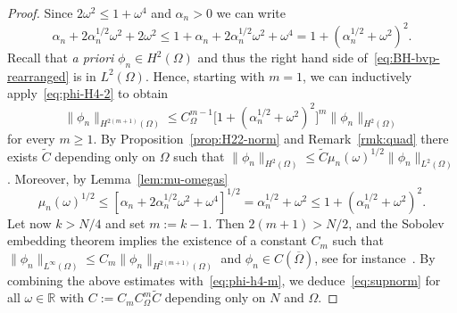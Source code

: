\documentclass[a4paper, reqno]{amsart}
\numberwithin{equation}{section}
\theoremstyle{plain}
\theoremstyle{definition}
\theoremstyle{remark}
\newcommand{\RR}{\mathbb{R}}
\begin{document}
\begin{proof}
  Since $2\omega^2\leq 1+\omega^4$ and $\alpha_n>0$ we can write
  \begin{equation*}
    \alpha_n + 2\alpha_n^{1/2}\omega^2 + 2\omega^2
    \leq  1+\alpha_n + 2\alpha_n^{1/2}\omega^2 + \omega^4
    =1+(\alpha_n^{1/2}+\omega^2)^2.
  \end{equation*}
  Recall that \emph{a priori} $\phi_n\in H^2(\Omega)$ and thus the right hand side of~\eqref{eq:BH-bvp-rearranged} is in $L^2(\Omega)$. Hence, starting with $m=1$, we can inductively apply~\eqref{eq:phi-H4-2} to obtain
  \begin{equation}
    \label{eq:phi-h4-m}
    \| \phi_n \|_{H^{2(m+1)}(\Omega)}
    \leq C_\Omega^{m-1} \bigl[1+(\alpha_n^{1/2}+\omega^2)^2\bigr]^{m} \| \phi_n \|_{H^2(\Omega)}
  \end{equation}
  for every $m\geq 1$. By Proposition~\ref{prop:H22-norm} and Remark~\ref{rmk:quad} there exists $\widetilde{C}$ depending only on $\Omega$ such that $\| \phi_n \|_{H^2(\Omega)} \leq \widetilde{C} \mu_n(\omega)^{1/2}\| \phi_n \|_{L^2(\Omega)}$. Moreover, by Lemma~\ref{lem:mu-omegas}
  \begin{equation*}
    \mu_n(\omega)^{1/2}
    \leq [\alpha_n+2\alpha_n^{1/2}\omega^2+\omega^4]^{1/2}
    =\alpha_n^{1/2}+\omega^2
    \leq 1+(\alpha_n^{1/2}+\omega^2)^2.
  \end{equation*}
  Let now $k>N/4$ and set $m:=k-1$. Then $2(m+1)>N/2$, and the Sobolev embedding theorem implies the existence of a constant $C_m$ such that $\| \phi_n \|_{L^\infty(\Omega)} \leq C_m \| \phi_n \|_{H^{2(m+1)}(\Omega)}$ and $\phi_n \in C(\overline\Omega)$, see for instance~\cite[Theorem 7.26]{GT}. By combining the above estimates with~\eqref{eq:phi-h4-m}, we deduce~\eqref{eq:supnorm} for all $\omega\in\RR$ with $C := C_m C_\Omega^{m} \widetilde{C}$ depending only on $N$ and $\Omega$.
\end{proof}
\end{document}
